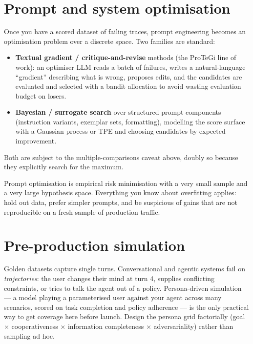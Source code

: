 \documentclass[11pt,twoside,openright]{book}
\theoremstyle{definition}
\theoremstyle{plain}
\theoremstyle{remark}
\newcommand{\term}[1]{\textbf{#1}}
\begin{document}
\section{Prompt and system optimisation}

Once you have a scored dataset of failing traces, prompt engineering becomes an
optimisation problem over a discrete space. Two families are standard:

\begin{itemize}[leftmargin=1.4em]
  \item \term{Textual gradient / critique-and-revise} methods (the ProTeGi line
        of work): an optimiser LLM reads a batch of failures, writes a
        natural-language ``gradient'' describing what is wrong, proposes edits,
        and the candidates are evaluated and selected with a bandit allocation
        to avoid wasting evaluation budget on losers.
  \item \term{Bayesian / surrogate search} over structured prompt components
        (instruction variants, exemplar sets, formatting), modelling the score
        surface with a Gaussian process or TPE and choosing candidates by
        expected improvement.
\end{itemize}

Both are subject to the multiple-comparisons caveat above, doubly so because
they explicitly search for the maximum.

\begin{keyidea}
Prompt optimisation is empirical risk minimisation with a very small sample and
a very large hypothesis space. Everything you know about overfitting applies:
hold out data, prefer simpler prompts, and be suspicious of gains that are not
reproducible on a fresh sample of production traffic.
\end{keyidea}

\section{Pre-production simulation}

Golden datasets capture single turns. Conversational and agentic systems fail on
\emph{trajectories}: the user changes their mind at turn 4, supplies conflicting
constraints, or tries to talk the agent out of a policy. Persona-driven
simulation --- a model playing a parameterised user against your agent across
many scenarios, scored on task completion and policy adherence --- is the only
practical way to get coverage here before launch. Design the persona grid
factorially (goal $\times$ cooperativeness $\times$ information completeness
$\times$ adversariality) rather than sampling ad hoc.
\end{document}
